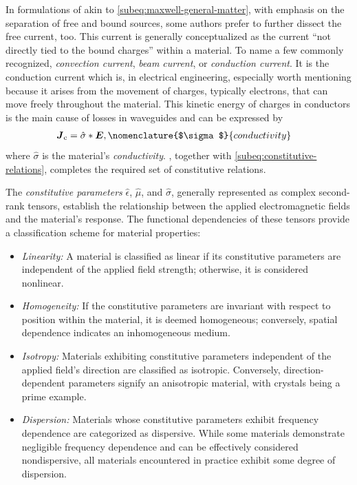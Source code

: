 \documentclass[11pt,a4paper,twoside,openany]{report}
\begin{document}
\begin{remark}
    In formulations of akin to \cref{subeq:maxwell-general-matter}, with emphasis on the separation of free and bound sources, some authors prefer to further dissect the free current, too. This current is generally conceptualized as the current \enquote{not directly tied to the bound charges} within a material. To name a few commonly recognized, \emph{convection current}, \emph{beam current}, or \emph{conduction current}. It is the conduction current which is, in electrical engineering, especially worth mentioning because it arises from the movement of charges, typically electrons, that can move freely throughout the material. This kinetic energy of charges in conductors is the main cause of losses in waveguides and can be expressed by
    \begin{align}
        \label{eq:constitutive-relation-conductivity}
        \vec J_{\mathrm c} &= \hat\sigma \ast \vec E,
        \nomenclature{$\sigma$}{conductivity }%
    \end{align}
    where $\hat\sigma$ is the material's \emph{conductivity}. , together with \cref{subeq:constitutive-relations}, completes the required set of constitutive relations.
\end{remark}

The \emph{constitutive parameters} $\hat\epsilon$, $\hat\mu$, and $\hat\sigma$, generally represented as complex second-rank tensors, establish the relationship between the applied electromagnetic fields and the material's response. The functional dependencies of these tensors provide a classification scheme for material properties:
\begin{itemize}
    \item \emph{Linearity:} A material is classified as linear if its constitutive parameters are independent of the applied field strength; otherwise, it is considered nonlinear.
    \item \emph{Homogeneity:} If the constitutive parameters are invariant with respect to position within the material, it is deemed homogeneous; conversely, spatial dependence indicates an inhomogeneous medium.
    \item \emph{Isotropy:} Materials exhibiting constitutive parameters independent of the applied field's direction are classified as isotropic. Conversely, direction-dependent parameters signify an anisotropic material, with crystals being a prime example.
    \item \emph{Dispersion:} Materials whose constitutive parameters exhibit frequency dependence are categorized as dispersive. While some materials demonstrate negligible frequency dependence and can be effectively considered nondispersive, all materials encountered in practice exhibit some degree of dispersion.
\end{itemize}
\end{document}
